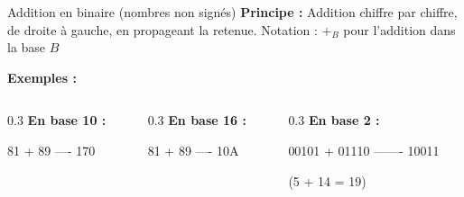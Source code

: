 \documentclass[aspectratio=1610]{beamer}
\begin{document}
\begin{frame}[fragile]{Addition en binaire (nombres non signés)}
  \textbf{Principe :} Addition chiffre par chiffre, de droite à gauche, en propageant la retenue.
  Notation : $+_B$ pour l'addition dans la base $B$

  \vspace{0.5em}

  \textbf{Exemples :}
  \begin{columns}
    \begin{column}{0.3\textwidth}
      \textbf{En base 10 :}
      \begin{semiverbatim}
      81
    + 89
    ----
     170
      \end{semiverbatim}
    \end{column}
    \begin{column}{0.3\textwidth}
      \textbf{En base 16 :}
      \begin{semiverbatim}
      81
    + 89
    ----
     10A
      \end{semiverbatim}
    \end{column}
    \begin{column}{0.3\textwidth}
      \textbf{En base 2 :}
      \begin{semiverbatim}
     00101
   + 01110
   -------
     10011
      \end{semiverbatim}
      \small (5 + 14 = 19)
    \end{column}
  \end{columns}
\end{frame}
\end{document}
